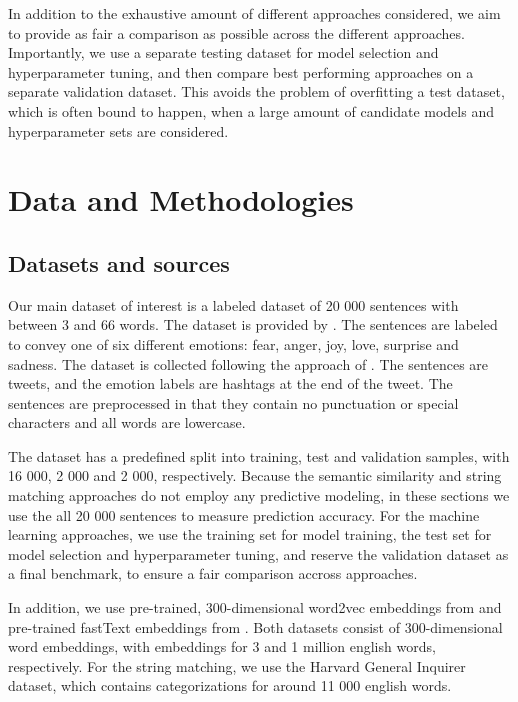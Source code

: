 \documentclass[conference]{IEEEtran}
\begin{document}
In addition to the exhaustive amount of different approaches considered, we aim to provide as fair a comparison as possible across the different approaches. Importantly, we use a separate testing dataset for model selection and hyperparameter tuning, and then compare best performing approaches on a separate validation dataset. This avoids the problem of overfitting a test dataset, which is often bound to happen, when a large amount of candidate models and hyperparameter sets are considered.

\section{Data and Methodologies}
\subsection{Datasets and sources}
Our main dataset of interest is a labeled dataset of 20 000 sentences with between 3 and 66 words. The dataset is provided by \cite{kaggledata}. The sentences are labeled to convey one of six different emotions: fear, anger, joy, love, surprise and sadness. The dataset is collected following the approach of \cite{saravia-etal-2018-carer}. The sentences are tweets, and the emotion labels are hashtags at the end of the tweet. The sentences are preprocessed in that they contain no punctuation or special characters and all words are lowercase.

The dataset has a predefined split into training, test and validation samples, with 16 000, 2 000 and 2 000, respectively. Because the semantic similarity and string matching approaches do not employ any predictive modeling, in these sections we use the all 20 000 sentences to measure prediction accuracy. For the machine learning approaches, we use the training set for model training, the test set for model selection and hyperparameter tuning, and reserve the validation dataset as a final benchmark, to ensure a fair comparison accross approaches.

In addition, we use pre-trained, 300-dimensional word2vec embeddings  from \cite{mikolov2013distributed} and pre-trained fastText embeddings from \cite{bojanowski2016enriching}. Both datasets consist of 300-dimensional word embeddings, with embeddings for 3 and 1 million english words, respectively. For the string matching, we use the Harvard General Inquirer dataset, which contains categorizations for around 11 000 english words.
\end{document}
